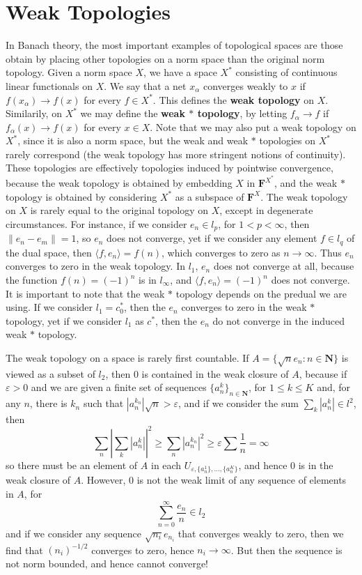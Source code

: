 \chapter{Weak Topologies}

\begin{example}
    In Banach theory, the most important examples of topological spaces are those obtain by placing other topologies on a norm space than the original norm topology. Given a norm space $X$, we have a space $X^*$ consisting of continuous linear functionals on $X$. We say that a net $x_\alpha$ converges weakly to $x$ if $f(x_\alpha) \to f(x)$ for every $f \in X^*$. This defines the {\bf weak topology} on $X$. Similarily, on $X^*$ we may define the {\bf weak $*$ topology}, by letting $f_\alpha \to f$ if $f_\alpha(x) \to f(x)$ for every $x \in X$. Note that we may also put a weak topology on $X^*$, since it is also a norm space, but the weak and weak $*$ topologies on $X^*$ rarely correspond (the weak topology has more stringent notions of continuity). These topologies are effectively topologies induced by pointwise convergence, because the weak topology is obtained by embedding $X$ in $\mathbf{F}^{X^*}$, and the weak $*$ topology is obtained by considering $X^*$ as a subspace of $\mathbf{F}^X$. The weak topology on $X$ is rarely equal to the original topology on $X$, except in degenerate circumstances. For instance, if we consider $e_n \in l_p$, for $1 < p < \infty$, then $\| e_n - e_m \| = 1$, so $e_n$ does not converge, yet if we consider any element $f \in l_q$ of the dual space, then $\langle f, e_n \rangle = f(n)$, which converges to zero as $n \to \infty$. Thus $e_n$ converges to zero in the weak topology. In $l_1$, $e_n$ does not converge at all, because the function $f(n) = (-1)^n$ is in $l_\infty$, and $\langle f, e_n \rangle = (-1)^n$ does not converge. It is important to note that the weak $*$ topology depends on the predual we are using. If we consider $l_1 = c_0^*$, then the $e_n$ converges to zero in the weak $*$ topology, yet if we consider $l_1$ as $c^*$, then the $e_n$ do not converge in the induced weak $*$ topology.

    The weak topology on a space is rarely first countable. If $A = \{ \sqrt{n} e_n : n \in \mathbf{N} \}$ is viewed as a subset of $l_2$, then 0 is contained in the weak closure of $A$, because if $\varepsilon > 0$ and we are given a finite set of sequences $\{ a_n^k \}_{n \in \mathbf{N}}$, for $1 \leq k \leq K$ and, for any $n$, there is $k_n$ such that $|a_n^{k_n}| \sqrt{n} > \varepsilon$, and if we consider the sum $\sum_k |a_n^k| \in l^2$, then
    \[ \sum_n \left|\sum_k |a_n^k| \right|^2 \geq \sum_n |a_n^{k_n}|^2 \geq \varepsilon \sum \frac{1}{n} = \infty \]
    so there must be an element of $A$ in each $U_{\varepsilon, \{ a_n^1 \}, \dots, \{ a_n^K \}}$, and hence $0$ is in the weak closure of $A$. However, 0 is not the weak limit of any sequence of elements in $A$, for
    \[ \sum_{n = 0}^\infty \frac{e_n}{n} \in l_2 \]
    and if we consider any sequence $\sqrt{n_i} e_{n_i}$ that converges weakly to zero, then we find that $(n_i)^{-1/2}$ converges to zero, hence $n_i \to \infty$. But then the sequence is not norm bounded, and hence cannot converge!
\end{example}
